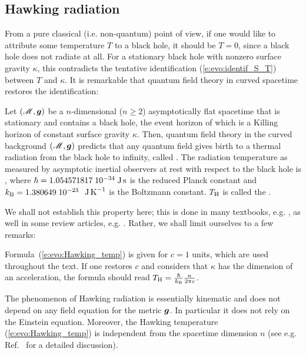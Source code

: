 \subsection{Hawking radiation}

From a pure classical (i.e. non-quantum) point of view, if one would like to attribute some
temperature $T$ to a black hole, it should be $T=0$, since a black hole does not radiate at all.
For a stationary black hole with nonzero surface gravity $\kappa$, this contradicts the tentative identification (\ref{e:evo:identif_S_T}) between $T$ and $\kappa$.
It is remarkable that quantum field theory in curved spacetime
restores the identification:

\begin{prop}
Let $(\mathscr{M},\bm{g})$ be a $n$-dimensional ($n\geq 2$) asymptotically flat
spacetime that is stationary and contains a black hole, the event horizon
of which is a Killing horizon of constant surface gravity $\kappa$.
Then, quantum field theory in the curved background $(\mathscr{M},\bm{g})$
predicts that any quantum field gives birth to a thermal radiation
from the black hole to infinity, called
. The radiation temperature
as measured by asymptotic inertial observers at rest with respect to the black hole
is
\be \label{e:evo:Hawking_temp}
     ,
\ee
where $\hbar = 1.054571817\; 10^{-34} {\rm\; J\, s}$ is the reduced Planck constant and
$k_{\rm B} = 1.380649\; 10^{-23}$ ${\rm\;  J\, K}^{-1}$ is the Boltzmann constant. $T_{\rm H}$ is called the
.
\end{prop}

We shall not establish this property here; this is done in many textbooks,
e.g. \cite{Wald84,Wald94,FroloN98,Carro04,FabbrN05}, as well in some review
articles, e.g. \cite{BroutMPS95,Damou04}. Rather, we shall limit
ourselves to a few remarks:

\begin{remark}\label{r:evo:Hawking_temp_units}
Formula~(\ref{e:evo:Hawking_temp}) is given for $c=1$
units, which are used throughout the text. If one restores $c$ and considers
that $\kappa$ has the dimension of an acceleration, the formula should read
$T_{\rm H} = \frac{\hbar}{k_{\rm B}} \frac{\kappa}{2\pi c}$.
\end{remark}

\begin{remark}
The phenomenon of Hawking radiation is essentially kinematic and does not depend on any field equation for the
metric $\bm{g}$. In particular it does not rely on the Einstein equation.
Moreover, the Hawking temperature (\ref{e:evo:Hawking_temp}) is independent from the spacetime dimension
$n$ (see e.g. Ref.~\cite{KantiW15} for a detailed discussion).
\end{remark}

